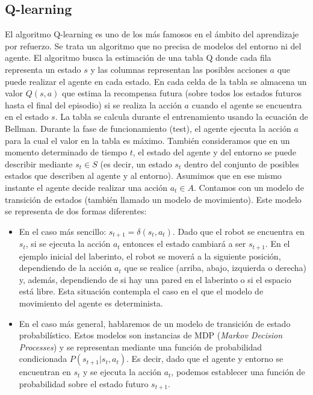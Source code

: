 \documentclass{article}
\begin{document}
\subsection{Q-learning}
El algoritmo Q-learning es uno de los más famosos en el ámbito del aprendizaje por refuerzo. Se trata un algoritmo que no precisa de modelos del entorno ni del agente. El algoritmo busca la estimación de una tabla Q donde cada fila representa un estado $s$ y las columnas representan las posibles acciones $a$ que puede realizar el agente en cada estado. En cada celda de la tabla se almacena un valor $Q(s, a)$ que estima la recompensa futura (sobre todos los estados futuros hasta el final del episodio) si se realiza la acción $a$ cuando el agente se encuentra en el estado $s$. La tabla se calcula durante el entrenamiento usando la ecuación de Bellman. Durante la fase de funcionamiento (test), el agente ejecuta la acción $a$ para la cual el valor en la tabla es máximo.
También consideramos que en un momento determinado de tiempo $t$, el estado del agente y del entorno se puede describir mediante $s_t \in S$ (es decir, un estado $s_t$ dentro del conjunto de posibles estados que describen al agente y al entorno). Asumimos que en ese mismo instante el agente decide realizar una acción $a_t \in A$. Contamos con un modelo de transición de estados (también llamado un modelo de movimiento). Este modelo se representa de dos formas diferentes:
\begin{itemize}
    \item En el caso más sencillo: $s_{t+1}=\delta(s_t, a_t)$. Dado que el robot se encuentra en $s_t$, si se ejecuta la acción $a_t$ entonces el estado cambiará a ser $s_{t+1}$. En el ejemplo inicial del laberinto, el robot se moverá a la siguiente posición, dependiendo de la acción $a_t$ que se realice (arriba, abajo, izquierda o derecha) y, además, dependiendo de si hay una pared en el laberinto o si el espacio está libre. Esta situación contempla el caso en el que el modelo de movimiento del agente es determinista.
    \item En el caso más general, hablaremos de un modelo de transición de estado probabilístico. Estos modelos son instancias de MDP (\emph{Markov Decision Processes}) y se representan mediante una función de probabilidad condicionada
    $P(s_{t+1}|s_t, a_t)$. Es decir, dado que el agente y entorno se encuentran en $s_t$ y se ejecuta la acción $a_t$, podemos establecer una función de probabilidad sobre el estado futuro $s_{t+1}$.
\end{itemize} 
\end{document}
